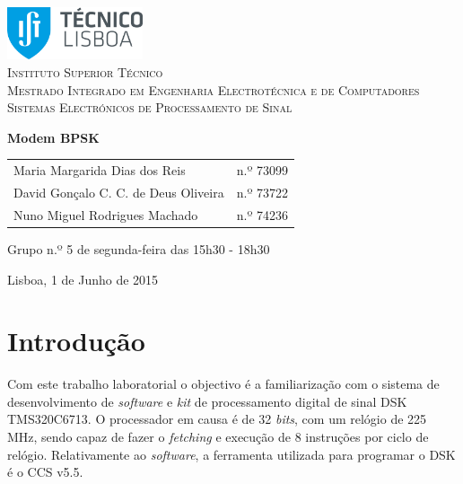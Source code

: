 \documentclass[11pt]{article}
\numberwithin{equation}{section}
\begin{document}
\begin{titlepage}
\begin{center}

\hfill \break
\hfill \break

\includegraphics[width=0.3\textwidth]{./logo}~\\[1cm] 

\textsc{\LARGE Instituto Superior Técnico}\\[0.25cm]
\textsc{\Large Mestrado Integrado em Engenharia Electrotécnica e de Computadores}\\[1.8cm]
\textsc{\huge Sistemas Electrónicos de Processamento de Sinal}\\[0.25cm]

\vspace{6mm}

{\huge \bfseries Modem BPSK \\[1cm]}

\begin{tabular}{ l l }
Maria Margarida Dias dos Reis & \hspace{2mm} n.º 73099 \\
David Gonçalo C. C. de Deus Oliveira & \hspace{2mm} n.º 73722 \\
Nuno Miguel Rodrigues Machado & \hspace{2mm} n.º 74236
\end{tabular}

\vspace{7mm}

Grupo n.º 5 de segunda-feira das 15h30 - 18h30

\vfill

{\large Lisboa, 1 de Junho de 2015} 

\end{center}
\end{titlepage}

\clearpage

\tableofcontents
\pagebreak

\clearpage
{}

\section{Introdução}

Com este trabalho laboratorial o objectivo é a familiarização com o sistema de desenvolvimento de \textit{software} e \textit{kit} de processamento digital de sinal DSK TMS320C6713. O processador em causa é de 32 \textit{bits}, com um relógio de 225 MHz, sendo capaz de fazer o \textit{fetching} e execução de 8 instruções por ciclo de relógio. Relativamente ao \textit{software}, a ferramenta utilizada para programar o DSK é o CCS v5.5.
\end{document}
